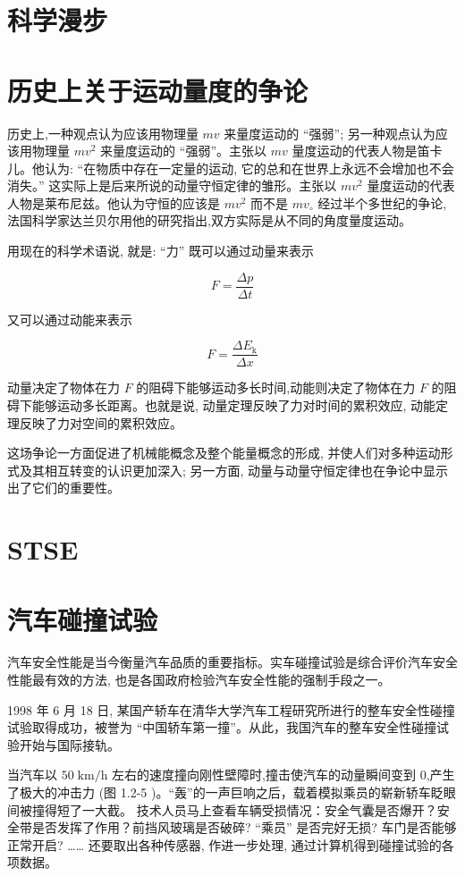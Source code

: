 \documentclass[10pt]{article}
\begin{document}
\section*{科学漫步}

\section*{历史上关于运动量度的争论}

历史上,一种观点认为应该用物理量 \({mv}\) 来量度运动的 “强弱”; 另一种观点认为应该用物理量 \(m{v}^{2}\) 来量度运动的 “强弱”。主张以 \({mv}\) 量度运动的代表人物是笛卡儿。他认为: “在物质中存在一定量的运动, 它的总和在世界上永远不会增加也不会消失。” 这实际上是后来所说的动量守恒定律的雏形。主张以 \(m{v}^{2}\) 量度运动的代表人物是莱布尼兹。他认为守恒的应该是 \(m{v}^{2}\) 而不是 \(m{v}_{ \circ }\) 经过半个多世纪的争论,法国科学家达兰贝尔用他的研究指出,双方实际是从不同的角度量度运动。

用现在的科学术语说, 就是: “力” 既可以通过动量来表示

\[
F = \frac{\Delta p}{\Delta t}
\]

又可以通过动能来表示

\[
F = \frac{\Delta {E}_{\mathrm{k}}}{\Delta x}
\]

动量决定了物体在力 \(F\) 的阻碍下能够运动多长时间,动能则决定了物体在力 \(F\) 的阻碍下能够运动多长距离。也就是说, 动量定理反映了力对时间的累积效应, 动能定理反映了力对空间的累积效应。

这场争论一方面促进了机械能概念及整个能量概念的形成, 并使人们对多种运动形式及其相互转变的认识更加深入; 另一方面, 动量与动量守恒定律也在争论中显示出了它们的重要性。

\section*{STSE}

\section*{汽车碰撞试验}

汽车安全性能是当今衡量汽车品质的重要指标。实车碰撞试验是综合评价汽车安全性能最有效的方法, 也是各国政府检验汽车安全性能的强制手段之一。

1998 年 6 月 18 日, 某国产轿车在清华大学汽车工程研究所进行的整车安全性碰撞试验取得成功，被誉为 “中国轿车第一撞”。从此，我国汽车的整车安全性碰撞试验开始与国际接轨。

当汽车以 \({50}\mathrm{\;{km}}/\mathrm{h}\) 左右的速度撞向刚性壁障时,撞击使汽车的动量瞬间变到 0,产生了极大的冲击力 (图 1.2-5 )。“轰”的一声巨响之后，载着模拟乘员的崭新轿车眨眼间被撞得短了一大截。 技术人员马上查看车辆受损情况：安全气囊是否爆开？安全带是否发挥了作用？前挡风玻璃是否破碎? “乘员” 是否完好无损? 车门是否能够正常开启? …… 还要取出各种传感器, 作进一步处理, 通过计算机得到碰撞试验的各项数据。
\end{document}
